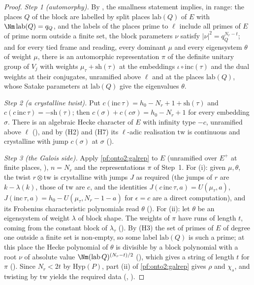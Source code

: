 \begin{proof}
\emph{Step 1 (automorphy).} By , the smallness statement implies, in range: the
places $Q$ of the block are labelled by split places $\mathrm{lab}(Q)$ of $E$ with $\Nm\,\mathrm{lab}(Q)=q_Q$, and the labels of the
places prime to $\ell$ include all primes of $E$ of prime norm outside a finite set, the block parameters $\nu$ satisfy
$|\nu|^2=q_Q^{N_r-t}$; and for every tied frame and reading, every dominant $\mu$ and every eigensystem $\theta$ of weight $\mu$, there is
an automorphic representation $\pi$ of the definite unitary group of $V_j$ with weights $\mu_\tau+\mathrm{sh}(\tau)$ at the embeddings
$\iota\circ\mathrm{inc}(\tau)$ and the dual weights at their conjugates, unramified above $\ell$ and at the places $\mathrm{lab}(Q)$, whose
Satake parameters at $\mathrm{lab}(Q)$ give the eigenvalues $\theta$.

\emph{Step 2 (a crystalline twist).} Put $c(\mathrm{inc}\,\tau)=h_0-N_r+1+\mathrm{sh}(\tau)$ and $c(c\,\mathrm{inc}\,\tau)=-\mathrm{sh}(\tau)$;
then $c(\sigma)+c(c\sigma)=h_0-N_r+1$ for every embedding $\sigma$. There is an algebraic Hecke character of $E$ with infinity type $-c$,
unramified above $\ell$ (), and by (H2) and (H7) its $\ell$-adic realisation
$\mathrm{tw}$ is continuous and crystalline with jump $c(\sigma)$ at $\sigma$ ().

\emph{Step 3 (the Galois side).} Apply \cref{pf:onto2:galrep} to $E$ (unramified over $E^+$ at finite places,
), $n=N_r$ and the representations $\pi$ of Step~1. For (i): given $\mu,\theta$, the
twist $r\otimes\mathrm{tw}$ is crystalline with jumps $J$ as required (the jumps of $r$ are $k-\lambda(k)$, those of $\mathrm{tw}$ are $c$,
and the identities $J(c\,\mathrm{inc}\,\tau,a)=U(\mu_\tau,a)$, $J(\mathrm{inc}\,\tau,a)=h_0-U(\mu_\tau,N_r-1-a)$ for $\epsilon=c$ are a direct
computation), and its Frobenius characteristic polynomials read $\theta$ (). For (ii): let
$\theta$ be an eigensystem of weight $\lambda$ of block shape. The weights of $\pi$ have runs of length $t$, coming from the constant
block of $\lambda_\tau$ (). By (H3) the set of primes of $E$ of degree one outside a
finite set is non-empty, so some label $\mathrm{lab}(Q)$ is such a prime; at this place the Hecke polynomial of $\theta$ is divisible
by a block polynomial with a root $\nu$ of absolute value $\Nm(\mathrm{lab}\,Q)^{(N_r-t)/2}$ (),
which gives a string of length $t$ for $\pi$ (). Since $N_r<2t$ by $\mathrm{Hyp}(P)$, part
(ii) of \cref{pf:onto2:galrep} gives $\rho$ and $\chi_s$, and twisting by $\mathrm{tw}$ yields the required data
(,
).
\end{proof}

